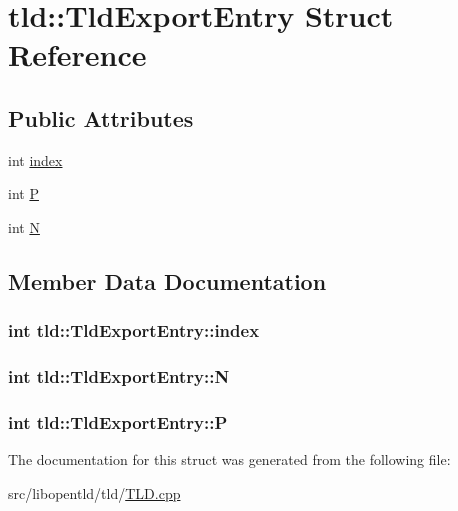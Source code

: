 \hypertarget{structtld_1_1_tld_export_entry}{
\section{tld::TldExportEntry Struct Reference}
\label{structtld_1_1_tld_export_entry}
}
\subsection*{Public Attributes}
\begin{DoxyCompactItemize}
\item 
int \hyperlink{structtld_1_1_tld_export_entry_a8b67c3367255beab5b728d8803c7cb78}{index}
\item 
int \hyperlink{structtld_1_1_tld_export_entry_aa7f1939c611aeff5ef09cebad2fdea79}{P}
\item 
int \hyperlink{structtld_1_1_tld_export_entry_a22f1125d40eecedb725e0f15aa07b01e}{N}
\end{DoxyCompactItemize}


\subsection{Member Data Documentation}
\hypertarget{structtld_1_1_tld_export_entry_a8b67c3367255beab5b728d8803c7cb78}{
\subsubsection[{index}]{\setlength{\rightskip}{0pt plus 5cm}int {\bf tld::TldExportEntry::index}}}
\label{structtld_1_1_tld_export_entry_a8b67c3367255beab5b728d8803c7cb78}
\hypertarget{structtld_1_1_tld_export_entry_a22f1125d40eecedb725e0f15aa07b01e}{
\subsubsection[{N}]{\setlength{\rightskip}{0pt plus 5cm}int {\bf tld::TldExportEntry::N}}}
\label{structtld_1_1_tld_export_entry_a22f1125d40eecedb725e0f15aa07b01e}
\hypertarget{structtld_1_1_tld_export_entry_aa7f1939c611aeff5ef09cebad2fdea79}{
\subsubsection[{P}]{\setlength{\rightskip}{0pt plus 5cm}int {\bf tld::TldExportEntry::P}}}
\label{structtld_1_1_tld_export_entry_aa7f1939c611aeff5ef09cebad2fdea79}


The documentation for this struct was generated from the following file:\begin{DoxyCompactItemize}
\item 
src/libopentld/tld/\hyperlink{_t_l_d_8cpp}{TLD.cpp}\end{DoxyCompactItemize}
